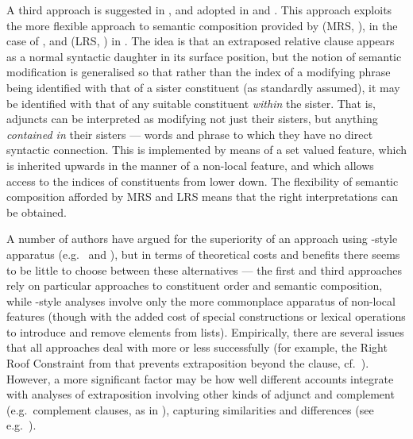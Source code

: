 \documentclass[output=paper
                ,modfonts
                ,nonflat
	        ,collection
	        ,collectionchapter
	        ,collectiontoclongg
 	        ,biblatex
                ,babelshorthands
                ,newtxmath
                ,draftmode
                ,colorlinks, citecolor=brown
]{./langsci/langscibook}
\begin{document}
A third approach is suggested in \cite{Kiss2005a}, and adopted in \cite{Crysmann2004a} and
\cite{Walker2017}. This
approach exploits the more flexible approach to semantic composition provided by  (MRS, \citealt{CFPS2005a}), in the case of \cite{Kiss2005a}, and  (LRS, \citealt{richtersailer-lrs04}) in \cite{Walker2017}. The idea is
that an extraposed relative clause appears as a normal syntactic daughter in its surface
position, but the notion of semantic modification is generalised so that rather than the
index of a modifying phrase being identified with that of a sister constituent (as
standardly assumed), it may be identified with that of any suitable constituent
\emph{within} the sister. That is, adjuncts can be interpreted as modifying not just their sisters, but
anything \emph{contained in} their sisters --- words and phrase to which they have no
direct syntactic connection.  This is implemented by means of a set valued
 feature, which is inherited upwards in the manner of a non-local
feature, and which allows access to the indices of constituents from lower down. The
flexibility of semantic composition afforded by MRS and LRS means that the right
interpretations can be obtained.

A number of authors have argued for the superiority of an approach using
-style apparatus (e.g.\ \citealt{Mueller2004b} and \citealt{Crysmann2013a}), but in
terms of theoretical costs and benefits there seems to be little to choose between these
alternatives --- the first and third approaches rely on particular approaches to constituent order
and semantic composition, while -style analyses involve only the more
commonplace apparatus of non-local features (though with the added cost of special
constructions or lexical operations to introduce and remove elements from 
lists). Empirically, there are several issues that all approaches deal with more or less
successfully (for example, the Right Roof Constraint from \citealt{Ross67a-Eng} that prevents
extraposition beyond the clause, cf.\ ). However, a more significant factor may
be how well different accounts integrate with analyses of extraposition involving other kinds of
adjunct and complement (e.g.\ complement clauses, as in ), capturing similarities
and differences (see e.g.\ \citealt{Crysmann2013a}).
\begin{exe}\ex\begin{xlist}
  \label{x:rc-125}
  \label{x:rc-126}
\end{xlist}\end{exe}
\begin{exe}
\end{exe}
  
\end{document}
